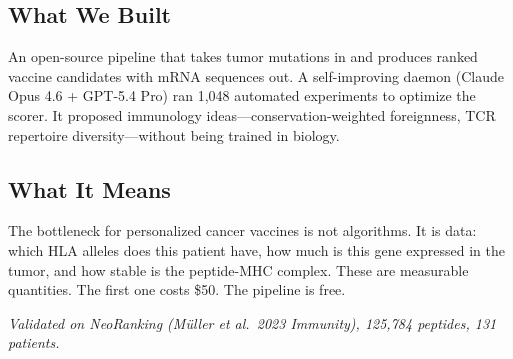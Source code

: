\documentclass[12pt]{article}
\begin{document}
\subsection*{What We Built}

An open-source pipeline that takes tumor mutations in and produces ranked vaccine candidates with mRNA sequences out. A self-improving daemon (Claude Opus 4.6 + GPT-5.4 Pro) ran 1,048 automated experiments to optimize the scorer. It proposed immunology ideas---conservation-weighted foreignness, TCR repertoire diversity---without being trained in biology.

\subsection*{What It Means}

The bottleneck for personalized cancer vaccines is not algorithms. It is data: which HLA alleles does this patient have, how much is this gene expressed in the tumor, and how stable is the peptide-MHC complex. These are measurable quantities. The first one costs \$50. The pipeline is free.

\vspace{8pt}
\begin{center}
\small\textit{Validated on NeoRanking (M\"{u}ller et al.\ 2023 Immunity), 125,784 peptides, 131 patients.}
\end{center}
\end{document}
